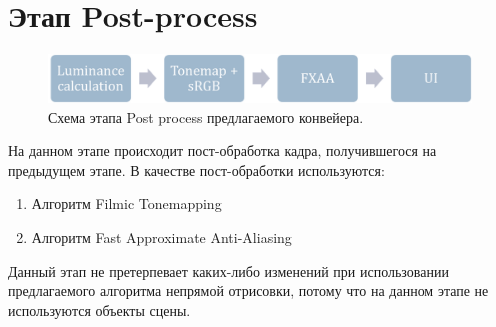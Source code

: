 \section{Этап Post-process} \label{ch3:post_process}
	\begin{figure}[ht!] 
		\center
		\includegraphics [scale=0.4] {my_folder/images//postprocess_schema}	
		\caption{Схема этапа Post process предлагаемого конвейера.} 
		\label{fig:renderpass_schema}
	\end{figure}
	
	На данном этапе происходит пост-обработка кадра, получившегося на предыдущем этапе. В качестве пост-обработки используются:
	\begin{enumerate}[1.]
		\item Алгоритм Filmic Tonemapping\cite{hable2010uncharted, dillereal}
		\item Алгоритм Fast Approximate Anti-Aliasing\cite{lottes2009fast}
	\end{enumerate}

	Данный этап не претерпевает каких-либо изменений при использовании предлагаемого алгоритма непрямой отрисовки, потому что на данном этапе не используются объекты сцены.